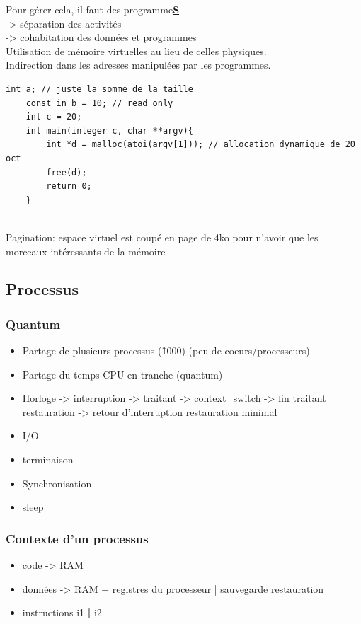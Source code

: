 \documentclass[11pt]{article}
\begin{document}
Pour gérer cela, il faut des programme\textbf{\underline{S}}\\
-> séparation des activités\\
-> cohabitation des données et programmes\\
Utilisation de mémoire virtuelles au lieu de celles physiques.\\
Indirection dans les adresses manipulées par les programmes.

\begin{lstlisting}[frame=single]  
    int a; // juste la somme de la taille
    const in b = 10; // read only
    int c = 20;
    int main(integer c, char **argv){
        int *d = malloc(atoi(argv[1])); // allocation dynamique de 20 oct
        free(d);
        return 0;
    }
    
\end{lstlisting}

Pagination: espace virtuel est coupé en page de 4ko pour n'avoir que les morceaux intéressants de la mémoire

\subsection{Processus}
\subsubsection{Quantum}
\begin{itemize}
	\item Partage de plusieurs processus (\~1000) (peu de coeurs/processeurs)
	\item Partage du temps CPU en tranche (quantum)
	\item Horloge -> interruption -> traitant -> context\_switch -> fin traitant restauration -> retour d'interruption restauration minimal
	\item I/O
	\item terminaison
	\item Synchronisation
	\item sleep
\end{itemize}
\pagebreak
\subsubsection{Contexte d'un processus}
\begin{itemize}
	\item code -> RAM
	\item données -> RAM + registres du processeur | sauvegarde restauration
	\item instructions i1 \textbf{|} i2
\end{itemize}
\end{document}
